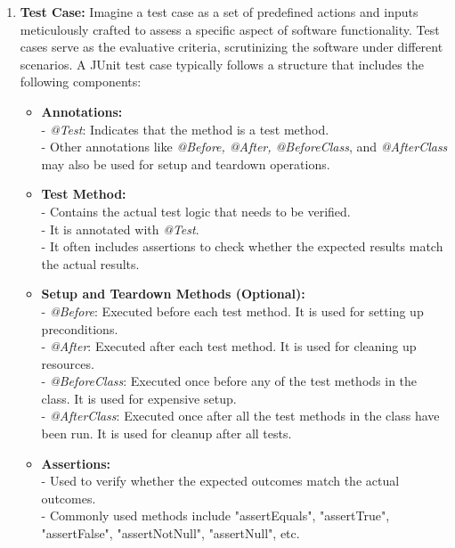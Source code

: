 \begin{enumerate}
  \item \textbf{Test Case:} Imagine a test case as a set of predefined actions and inputs meticulously crafted to assess a specific aspect of software functionality. Test cases serve as the evaluative criteria, scrutinizing the software under different scenarios. A JUnit test case typically follows a structure that includes the following components:

    \begin{itemize}
        \item \textbf{Annotations:} \\
        - \textit{@Test}: Indicates that the method is a test method. \\
        - Other annotations like \textit{@Before, @After, @BeforeClass}, and \textit{@AfterClass} may also be used for setup and teardown operations.

        \item \textbf{Test Method:} \\
        - Contains the actual test logic that needs to be verified. \\
        - It is annotated with \textit{@Test}. \\
        - It often includes assertions to check whether the expected results match the actual results.

        \item \textbf{Setup and Teardown Methods (Optional):} \\
        - \textit{@Before}: Executed before each test method. It is used for setting up preconditions. \\
        - \textit{@After}: Executed after each test method. It is used for cleaning up resources. \\
        - \textit{@BeforeClass}: Executed once before any of the test methods in the class. It is used for expensive setup. \\
        - \textit{@AfterClass}: Executed once after all the test methods in the class have been run. It is used for cleanup after all tests.

        \item \textbf{Assertions:} \\
        - Used to verify whether the expected outcomes match the actual outcomes. \\
        - Commonly used methods\cite{noauthor_assert_nodate} include "assertEquals", "assertTrue", "assertFalse", "assertNotNull", "assertNull", etc.
    \end{itemize}
  

\end{enumerate}
